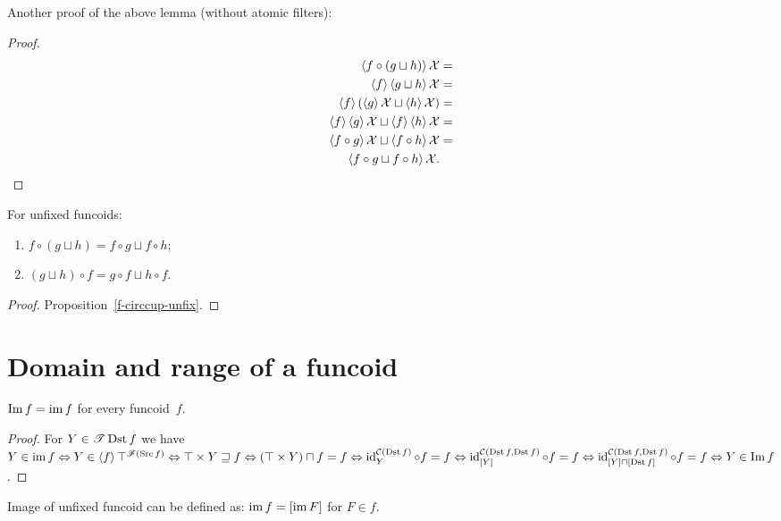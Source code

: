 Another proof of the above lemma (without atomic filters):

\begin{proof}
~
\begin{align*}
\left\langle f\circ(g\sqcup h)\right\rangle\mathcal{X} & =\\
\left\langle f\right\rangle\left\langle g\sqcup h\right\rangle\mathcal{X} & =\\
\left\langle f\right\rangle(\left\langle g\right\rangle\mathcal{X}\sqcup\left\langle h\right\rangle\mathcal{X}) & =\\
\left\langle f\right\rangle\left\langle g\right\rangle\mathcal{X}\sqcup\left\langle f\right\rangle\left\langle h\right\rangle\mathcal{X} & =\\
\left\langle f\circ g\right\rangle\mathcal{X}\sqcup\left\langle f\circ h\right\rangle\mathcal{X} & =\\
\left\langle f\circ g\sqcup f\circ h\right\rangle\mathcal{X}.
\end{align*}
\end{proof}

\begin{thm}
For unfixed funcoids:
\begin{enumerate}
\item $f\circ(g\sqcup h)=f\circ g\sqcup f\circ h$;
\item $(g\sqcup h)\circ f=g\circ f\sqcup h\circ f$.
\end{enumerate}
\end{thm}

\begin{proof}
Proposition~\ref{f-circcup-unfix}.
\end{proof}

\section{Domain and range of a funcoid}

\begin{thm}
$\operatorname{Im}f=\operatorname{im} f$ for every funcoid~$f$.
\end{thm}

\begin{proof}
For $Y\in\mathscr{T}\operatorname{Dst} f$ we have
$Y\in\operatorname{im} f\Leftrightarrow
Y\in\left\langle f\right\rangle\top^{\mathscr{F}(\operatorname{Src} f)}\Leftrightarrow
\top\times Y\sqsupseteq f\Leftrightarrow
(\top\times Y)\sqcap f=f\Leftrightarrow
\operatorname{id}^{\mathcal{C}(\operatorname{Dst} f)}_Y \circ f = f
\Leftrightarrow
\operatorname{id}^{\mathcal{C}(\operatorname{Dst} f,\operatorname{Dst} f)}_{[Y]} \circ f = f
\Leftrightarrow
\operatorname{id}^{\mathcal{C}(\operatorname{Dst} f,\operatorname{Dst} f)}_{[Y]\sqcap[\operatorname{Dst} f]} \circ f = f \Leftrightarrow
Y\in\operatorname{Im}f$.
\end{proof}

\begin{defn}
Image of unfixed funcoid can be defined as:
$\operatorname{im} f = [\operatorname{im} F]$ for $F\in f$.
\end{defn}


